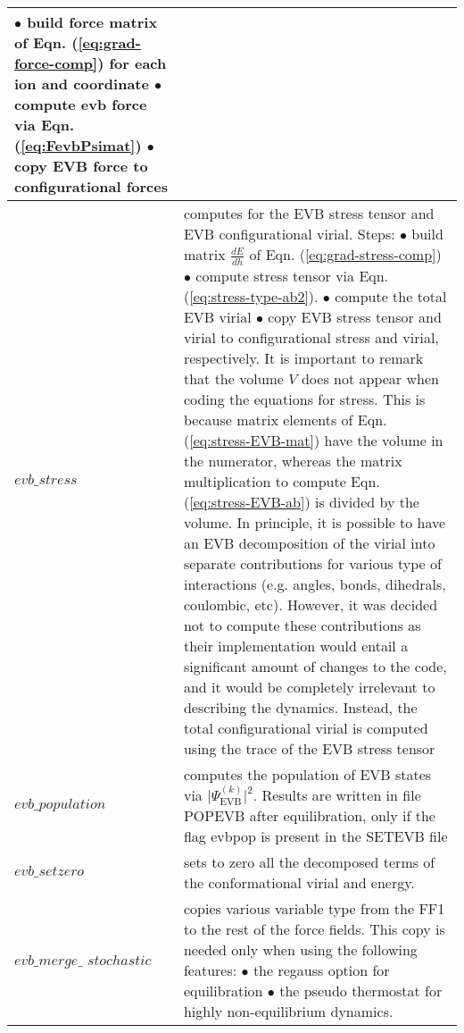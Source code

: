 \begin{center}
\begin{longtable*}[t]{p{0.15\textwidth}|p{0.85\textwidth}}
$\bullet$ build force matrix of Eqn. (\ref{eq:grad-force-comp}) for each ion and coordinate\newline
$\bullet$ compute evb force via Eqn. (\ref{eq:FevbPsimat}) \newline
$\bullet$ copy EVB force to configurational forces\\
\hline 
$evb\_stress$ &  computes for the EVB stress tensor and EVB configurational virial. Steps:\newline
$\bullet$ build matrix $\frac{dE}{dh}$ of Eqn. (\ref{eq:grad-stress-comp})\newline
$\bullet$ compute stress tensor via Eqn. (\ref{eq:stress-type-ab2}).\newline
$\bullet$ compute the total EVB virial\newline
$\bullet$ copy EVB stress tensor and virial to configurational stress and virial, respectively.\newline
It is important to remark that the volume $V$ does not appear when coding the equations for stress. This is because matrix elements of Eqn. (\ref{eq:stress-EVB-mat}) have the volume in the numerator, whereas the matrix multiplication to compute Eqn. (\ref{eq:stress-EVB-ab}) is divided by the volume.\newline
In principle, it is possible to have an EVB decomposition of the virial into separate
contributions for various type of interactions (e.g. angles, bonds, dihedrals,
 coulombic, etc). However, it was decided not to compute these contributions
 as their implementation would entail a significant amount of changes to the code, and
 it would be completely irrelevant to describing the dynamics. Instead, the total
 configurational virial is computed using the trace of the EVB stress tensor
\\
\hline 
$evb\_population$ & computes the population of EVB states via $\big|\Psi^{(k)}_{\text{EVB}}\big|^{2}$. Results are written in file POPEVB after equilibration, only if the flag evbpop is present in the SETEVB file\\
\hline 
$evb\_setzero$ & sets to zero all the decomposed terms of the conformational virial and energy.\\
\hline 
$evb\_merge\_$ $stochastic$ &  copies various variable type from the FF1
 to the rest of the force fields. This copy is needed only when using the following features:\newline
$\bullet$ the regauss option for equilibration\newline
$\bullet$ the pseudo thermostat for highly non-equilibrium dynamics.\\
\end{longtable*}
\end{center}

